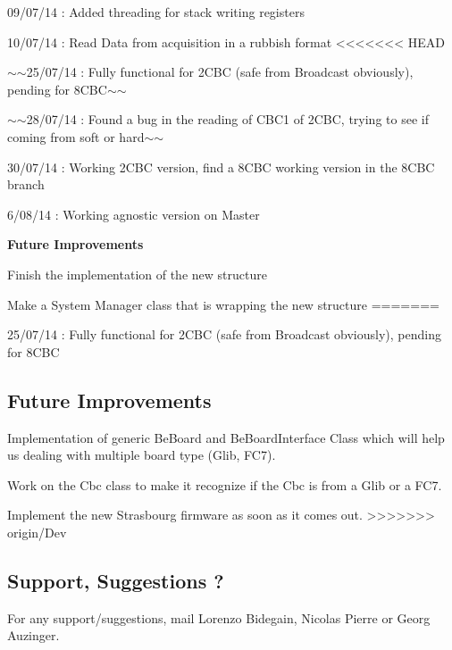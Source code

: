 \begin{DoxyItemize}
\item 09/07/14 \-: Added threading for stack writing registers
\item 10/07/14 \-: Read Data from acquisition in a rubbish format
<<<<<<< HEAD
\item $\sim$$\sim$25/07/14 \-: Fully functional for 2\-C\-B\-C (safe from Broadcast obviously), pending for 8\-C\-B\-C$\sim$$\sim$
\item $\sim$$\sim$28/07/14 \-: Found a bug in the reading of C\-B\-C1 of 2\-C\-B\-C, trying to see if coming from soft or hard$\sim$$\sim$
\item 30/07/14 \-: Working 2\-C\-B\-C version, find a 8\-C\-B\-C working version in the 8\-C\-B\-C branch
\item 6/08/14 \-: Working agnostic version on Master \par
 \par
 {\bfseries Future Improvements}
\item Finish the implementation of the new structure
\item Make a System Manager class that is wrapping the new structure
=======
\item 25/07/14 \-: Fully functional for 2\-C\-B\-C (safe from Broadcast obviously), pending for 8\-C\-B\-C
\end{DoxyItemize}

\subsection*{Future Improvements }


\begin{DoxyItemize}
\item Implementation of generic Be\-Board and Be\-Board\-Interface Class which will help us dealing with multiple board type (Glib, F\-C7).
\item Work on the Cbc class to make it recognize if the Cbc is from a Glib or a F\-C7.
\item Implement the new Strasbourg firmware as soon as it comes out.
>>>>>>> origin/Dev
\end{DoxyItemize}

\subsection*{Support, Suggestions ? }

For any support/suggestions, mail Lorenzo Bidegain, Nicolas Pierre or Georg Auzinger. 